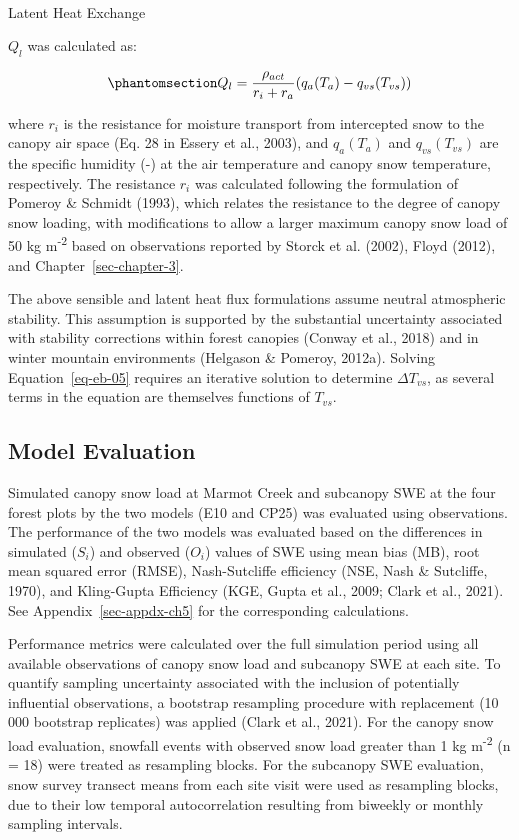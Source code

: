 \documentclass[
  letterpaper,
]{tex/uofsthesis-cs}
\makeatletter
\let\oldparagraph\paragraph
\renewcommand{\paragraph}{
    \@ifstar
      \xxxParagraphStar
      \xxxParagraphNoStar
  }
\newcommand{\xxxParagraphStar}[1]{\oldparagraph*{#1}\mbox{}}
\newcommand{\xxxParagraphNoStar}[1]{\oldparagraph{#1}\mbox{}}
\makeatother
\begin{document}
\paragraph{Latent Heat Exchange}\label{latent-heat-exchange}

\(Q_l\) was calculated as:

\begin{equation}\phantomsection\label{eq-ql-05}{
Q_l = \frac{\rho_{act}}{r_i+r_a} (q_a(T_a) - q_{vs}(T_{vs}))
}\end{equation}

where \(r_i\) is the resistance for moisture transport from intercepted
snow to the canopy air space (Eq. 28 in Essery et al., 2003), and
\(q_a(T_a)\) and \(q_{vs}(T_{vs})\) are the specific humidity (-) at the
air temperature and canopy snow temperature, respectively. The
resistance \(r_i\) was calculated following the formulation of Pomeroy
\& Schmidt (1993), which relates the resistance to the degree of canopy
snow loading, with modifications to allow a larger maximum canopy snow
load of 50 kg m\textsuperscript{-2} based on observations reported by
Storck et al. (2002), Floyd (2012), and Chapter~\ref{sec-chapter-3}.

The above sensible and latent heat flux formulations assume neutral
atmospheric stability. This assumption is supported by the substantial
uncertainty associated with stability corrections within forest canopies
(Conway et al., 2018) and in winter mountain environments (Helgason \&
Pomeroy, 2012a). Solving Equation~\ref{eq-eb-05} requires an iterative
solution to determine \(\Delta T_{vs}\), as several terms in the
equation are themselves functions of \(T_{vs}\).

\subsection{Model Evaluation}\label{model-evaluation-1}

Simulated canopy snow load at Marmot Creek and subcanopy SWE at the four
forest plots by the two models (E10 and CP25) was evaluated using
observations. The performance of the two models was evaluated based on
the differences in simulated (\(S_i\)) and observed (\(O_i\)) values of
SWE using mean bias (MB), root mean squared error (RMSE), Nash-Sutcliffe
efficiency (NSE, Nash \& Sutcliffe, 1970), and Kling-Gupta Efficiency
(KGE, Gupta et al., 2009; Clark et al., 2021). See
Appendix~\ref{sec-appdx-ch5} for the corresponding calculations.

Performance metrics were calculated over the full simulation period
using all available observations of canopy snow load and subcanopy SWE
at each site. To quantify sampling uncertainty associated with the
inclusion of potentially influential observations, a bootstrap
resampling procedure with replacement (10 000 bootstrap replicates) was
applied (Clark et al., 2021). For the canopy snow load evaluation,
snowfall events with observed snow load greater than 1 kg
m\textsuperscript{-2} (n = 18) were treated as resampling blocks. For
the subcanopy SWE evaluation, snow survey transect means from each site
visit were used as resampling blocks, due to their low temporal
autocorrelation resulting from biweekly or monthly sampling intervals.
\end{document}
